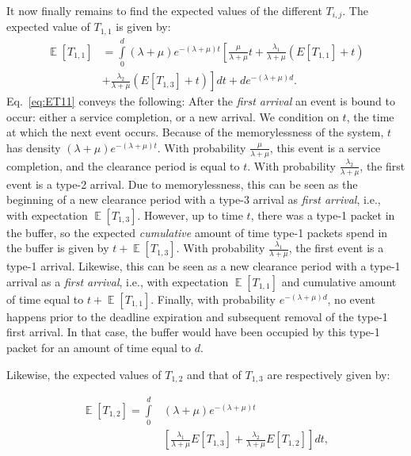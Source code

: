 \documentclass[preprint,12pt]{elsarticle}
\theoremstyle{definition}
\theoremstyle{plain}
\theoremstyle{remark}
\newcommand{\e}{e}
\DeclareMathOperator{\E}{\mathbb{E}}
\begin{document}
It now finally remains to find the expected values of the different $T_{i,j}$. The expected value of $T_{1,1}$ is given by:
\begin{equation}\label{eq:ET11}
\begin{split}
\E[T_{1,1}] & = \int\limits_{0}^{d}  (\lambda+\mu)\e^{-(\lambda+\mu)t}\left[\frac{\mu}{\lambda+\mu} t + \frac{  \lambda_{1}}{\lambda+\mu}\left(E[T_{1,1}]+t\right)\right.\\
  & \left. + \frac{\lambda_{2}}{\lambda+\mu}(E[T_{1,3}]+t) \right] dt + d\e^{-(\lambda+\mu)d}.
\end{split}
\end{equation}
Eq.~\eqref{eq:ET11} conveys the following: After the \emph{first arrival} an event is bound to occur: either a service completion, or a new arrival. We condition on $t$, the time at which the next event occurs. Because of the memorylessness of the system, $t$ has density $(\lambda+\mu) \e^{-(\lambda+\mu)t}$. With probability $\frac{\mu}{\lambda+\mu}$, this event is a service completion, and the clearance period is equal to $t$. With probability $\frac{\lambda_{2}}{\lambda+\mu}$, the first event is a type-2 arrival. Due to memorylessness, this can be seen as the beginning of a new clearance period with a type-3 arrival as \emph{first arrival}, i.e., with expectation $\E[T_{1,3}]$. However, up to time $t$, there was a type-1 packet in the buffer, so the expected \emph{cumulative} amount of time type-1 packets spend in the buffer is given by $t+\E[T_{1,3}]$. With probability $\frac{\lambda_1}{\lambda+\mu}$, the first event is a type-1 arrival. Likewise, this can be seen as a new clearance period with a type-1 arrival as a \emph{first arrival}, i.e., with expectation $\E[T_{1,1}]$ and cumulative amount of time equal to $t+\E[T_{1,1}]$. Finally, with probability $\e^{-(\lambda+\mu)d}$, no event happens prior to the deadline expiration and subsequent removal of the type-1 first arrival. In that case, the buffer would have been occupied by this type-1 packet for an amount of time equal to $d$.

Likewise, the expected values of $T_{1,2}$ and that of $T_{1,3}$ are respectively given by:

    \begin{equation} \label{eq:ET12}
    \begin{split}
    \E[T_{1,2}] =  \int\limits_{0}^{d}  & (\lambda+\mu)\e^{-(\lambda+\mu)t} \\
     & \left[\frac{\lambda_{1}}{\lambda+\mu}E[T_{1,3}]  +  \frac{\lambda_{2}}{\lambda+\mu}E[T_{1,2}]\right] dt,
    \end{split}
    \end{equation}
\end{document}
